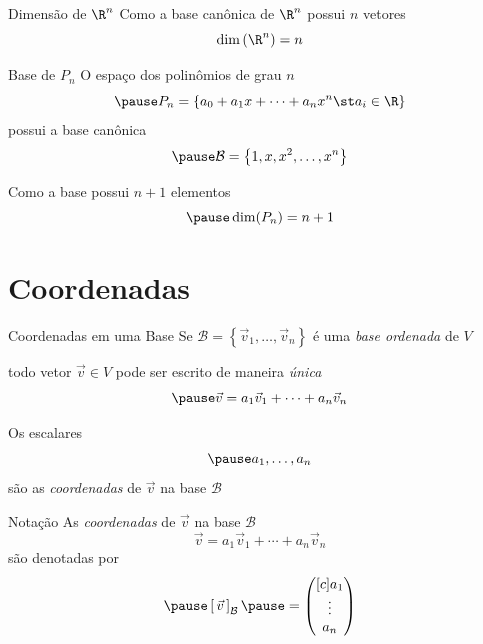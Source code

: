 \documentclass[fleqn,aspectratio=169,12pt]{beamer}
\begin{document}
\begin{frame}{Dimensão de $\R^{n}$}
  Como a base canônica de $\R^n$ possui $n$ vetores
  \[
    \dim\left(\R^{n}\right) = n
  \]
\end{frame}

\begin{frame}{Base de $P_{n}$}
  O espaço dos polinômios de grau $n$
  \[
    \pause
    P_{n} = \left\{ a_{0} + a_1x + \cdots + a_nx^n \st a_i \in \R \right\}
  \]
  \pause
  possui a base canônica
  \[
    \pause
    \mathcal{B} = \left\{ 1, x, x^2, \ldots, x^n \right\}
  \]

  \pause
  Como a base possui $n+1$ elementos
  \[
    \pause
    \dim(P_n) = n + 1
  \]
\end{frame}

\section{Coordenadas}

\begin{frame}{Coordenadas em uma Base}
  Se
  \(
    \mathcal{B} = \left\{ \vec{v}_{1}, \ldots, \vec{v}_{n} \right\}
  \)
  é uma \emph{base ordenada} de $V$

  \pause
  todo vetor $\vec{v}\in V$ pode ser escrito de maneira \emph{única}
  \[
    \pause
    \vec{v} = a_1\vec{v}_1 + \cdots + a_n\vec{v}_n
  \]

  \pause
  Os escalares
  \[
    \pause
    a_1, \ldots, a_n
  \]
  \pause
  são as \emph{coordenadas} de $\vec{v}$ na base $\mathcal{B}$
\end{frame}

\begin{frame}{Notação}
  As \emph{coordenadas} de $\vec{v}$ na base $\mathcal{B}$
  \[
    \vec{v} = a_1\vec{v}_1 + \cdots + a_n\vec{v}_n
  \]
  \pause
  são denotadas por
  \[
    \pause
    \left[\,\vec{v}\,\right]_{\mathcal{B}}
    \pause =
    \begin{pmatrix}[c]
      a_{1}  \\
      \vdots \\
      a_{n}
    \end{pmatrix}
  \]
\end{frame}
\end{document}
